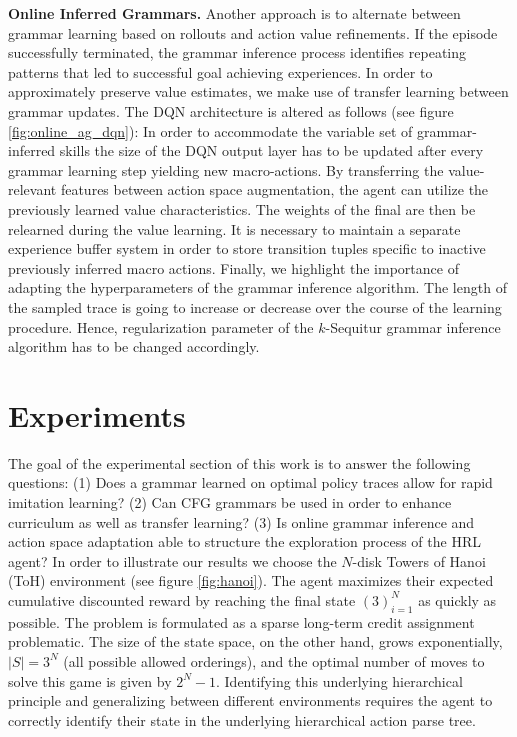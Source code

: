 \documentclass[10pt,letterpaper]{article}
\begin{document}
\textbf{Online Inferred Grammars.} Another approach is to alternate between grammar learning based on rollouts and action value refinements. If the episode successfully terminated, the grammar inference process identifies repeating patterns that led to successful goal achieving experiences.
In order to approximately preserve value estimates, we make use of transfer learning between grammar updates. The DQN architecture is altered as follows (see figure \ref{fig:online_ag_dqn}): In order to accommodate the variable set of grammar-inferred skills the size of the DQN output layer has to be updated after every grammar learning step yielding new macro-actions. By transferring the value-relevant features between action space augmentation, the agent can utilize the previously learned value characteristics. The weights of the final are then be relearned during the value learning. It is necessary to maintain a separate experience buffer system in order to store transition tuples specific to inactive previously inferred macro actions.  
Finally, we highlight the importance of adapting the hyperparameters of the grammar inference algorithm. The length of the sampled trace is going to increase or decrease over the course of the learning procedure. Hence, regularization parameter of the $k$-Sequitur grammar inference algorithm has to be changed accordingly.

\section{Experiments}

The goal of the experimental section of this work is to answer the following questions: (1) Does a grammar learned on optimal policy traces allow for rapid imitation learning? (2) Can CFG grammars be used in order to enhance curriculum as well as transfer learning? (3) Is online grammar inference and action space adaptation able to structure the exploration process of the HRL agent?
In order to illustrate our results we choose the $N$-disk Towers of Hanoi (ToH) environment (see figure \ref{fig:hanoi}).
The agent maximizes their expected cumulative discounted reward by reaching the final state $(3)_{i=1}^N$ as quickly as possible. The problem is formulated as a sparse long-term credit assignment problematic. The size of the state space, on the other hand, grows exponentially, $|S| = 3^N$ (all possible allowed orderings), and the optimal number of moves to solve this game is given by $2^N - 1$. Identifying this underlying hierarchical principle and generalizing between different environments requires the agent to correctly identify their state in the underlying hierarchical action parse tree.
\end{document}
